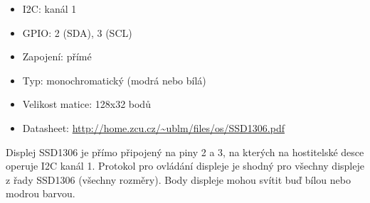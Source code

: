 \documentclass{article}
\newcommand\lang[2]{#1}
\begin{document}
\begin{itemize}
	\item I2C: \lang{kanál}{channel} 1
	\item GPIO: 2 (SDA), 3 (SCL)
	\item \lang{Zapojení: přímé}{Wiring: direct}
	\item \lang{Typ: monochromatický (modrá nebo bílá)}{Type: monochromatic (blue or white)}
	\item \lang{Velikost matice: 128x32 bodů}{Matrix size: 128x32 pixels}
	\item Datasheet: \url{http://home.zcu.cz/~ublm/files/os/SSD1306.pdf}
\end{itemize}

\lang{Displej SSD1306 je přímo připojený na piny 2 a 3, na kterých na hostitelské desce operuje I2C kanál 1. Protokol pro ovládání displeje je shodný pro všechny displeje z řady SSD1306 (všechny rozměry). Body displeje mohou svítit buď bílou nebo modrou barvou.}
{The SSD1306 display is directly connected to pins 2 and 3, on which the host board operates I2C channel 1. The protocol is common for all SSD1306 displays (all variants and dimensions). Pixels glow either blue or white.}
\end{document}
